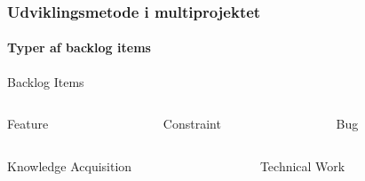 \begin{frame}
    \frametitle{Udviklingsmetode i multiprojektet}
    \framesubtitle{Typer af backlog items}
      \begin{mtjbox}[backgroundcolor=color1!5, linecolor=color1!40]
        Backlog Items
        \begin{columns}
          \begin{column}{0.30\textwidth}
            \begin{mtjbox}
              Feature
            \end{mtjbox}
          \end{column}
          \begin{column}{0.30\textwidth}
            \begin{mtjbox}
              Constraint
            \end{mtjbox}
          \end{column}
          \begin{column}{0.30\textwidth}
            \begin{mtjbox}
              Bug
            \end{mtjbox}
          \end{column}
        \end{columns}
        
        \begin{columns}
          \begin{column}{0.49\textwidth}
            \begin{mtjbox}
              Knowledge Acquisition
            \end{mtjbox}
          \end{column}
          \begin{column}{0.49\textwidth}
            \begin{mtjbox}
              Technical Work
            \end{mtjbox}
          \end{column}
        \end{columns}
      \end{mtjbox}
    
\end{frame}

